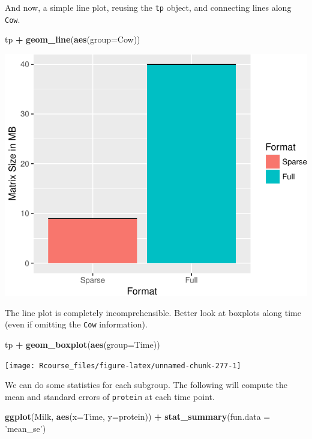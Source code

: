 \documentclass[]{book}
\newenvironment{Shaded}{\begin{snugshade}}{\end{snugshade}}
\newcommand{\KeywordTok}[1]{\textcolor[rgb]{0.13,0.29,0.53}{\textbf{#1}}}
\newcommand{\DataTypeTok}[1]{\textcolor[rgb]{0.13,0.29,0.53}{#1}}
\newcommand{\StringTok}[1]{\textcolor[rgb]{0.31,0.60,0.02}{#1}}
\newcommand{\OperatorTok}[1]{\textcolor[rgb]{0.81,0.36,0.00}{\textbf{#1}}}
\newcommand{\NormalTok}[1]{#1}
\theoremstyle{definition}
\theoremstyle{definition}
\theoremstyle{definition}
\theoremstyle{remark}
\begin{document}
And now, a simple line plot, reusing the \texttt{tp} object, and
connecting lines along \texttt{Cow}.

\begin{Shaded}
\begin{Highlighting}[]
\NormalTok{tp }\OperatorTok{+}\StringTok{ }\KeywordTok{geom_line}\NormalTok{(}\KeywordTok{aes}\NormalTok{(}\DataTypeTok{group=}\NormalTok{Cow))}
\end{Highlighting}
\end{Shaded}

\includegraphics[width=0.5\linewidth]{Rcourse_files/figure-latex/unnamed-chunk-276-1}

The line plot is completely incomprehensible. Better look at boxplots
along time (even if omitting the \texttt{Cow} information).

\begin{Shaded}
\begin{Highlighting}[]
\NormalTok{tp }\OperatorTok{+}\StringTok{ }\KeywordTok{geom_boxplot}\NormalTok{(}\KeywordTok{aes}\NormalTok{(}\DataTypeTok{group=}\NormalTok{Time))}
\end{Highlighting}
\end{Shaded}

\texttt{[image: Rcourse\_files/figure-latex/unnamed-chunk-277-1]}

We can do some statistics for each subgroup. The following will compute
the mean and standard errors of \texttt{protein} at each time point.

\begin{Shaded}
\begin{Highlighting}[]
\KeywordTok{ggplot}\NormalTok{(Milk, }\KeywordTok{aes}\NormalTok{(}\DataTypeTok{x=}\NormalTok{Time, }\DataTypeTok{y=}\NormalTok{protein)) }\OperatorTok{+}
\StringTok{  }\KeywordTok{stat_summary}\NormalTok{(}\DataTypeTok{fun.data =} \StringTok{'mean_se'}\NormalTok{)}
\end{Highlighting}
\end{Shaded}
\end{document}
